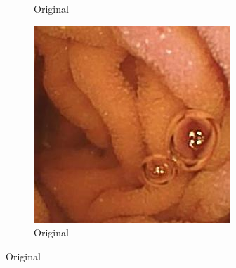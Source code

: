 \begin{figure}[H]
\begin{subfigure}[b]{0.32\textwidth}
    \caption{Original}
  \end{subfigure}
  \begin{subfigure}[b]{0.32\textwidth}
    \includegraphics[width=\textwidth]{Chapter7/hr_456.jpg}
    \caption{Original}
  \end{subfigure}


\end{figure}
